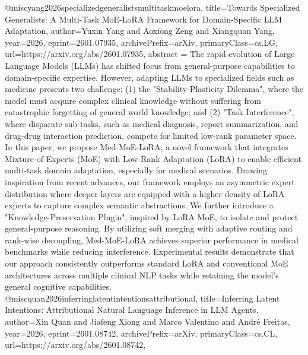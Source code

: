 {}@misc{yang2026specializedgeneralistsmultitaskmoelora,
      title={Towards Specialized Generalists: A Multi-Task MoE-LoRA Framework for Domain-Specific LLM Adaptation}, 
      author={Yuxin Yang and Aoxiong Zeng and Xiangquan Yang},
      year={2026},
      eprint={2601.07935},
      archivePrefix={arXiv},
      primaryClass={cs.LG},
      url={https://arxiv.org/abs/2601.07935},
      abstract = {The rapid evolution of Large Language Models (LLMs) has shifted focus from general-purpose capabilities to domain-specific expertise. However, adapting LLMs to specialized fields such as medicine presents two challenge: (1) the "Stability-Plasticity Dilemma", where the model must acquire complex clinical knowledge without suffering from catastrophic forgetting of general world knowledge; and (2) "Task Interference", where disparate sub-tasks, such as medical diagnosis, report summarization, and drug-drug interaction prediction, compete for limited low-rank parameter space. In this paper, we propose Med-MoE-LoRA, a novel framework that integrates Mixture-of-Experts (MoE) with Low-Rank Adaptation (LoRA) to enable efficient multi-task domain adaptation, especially for medical scenarios. Drawing inspiration from recent advances, our framework employs an asymmetric expert distribution where deeper layers are equipped with a higher density of LoRA experts to capture complex semantic abstractions. We further introduce a "Knowledge-Preservation Plugin", inspired by LoRA MoE, to isolate and protect general-purpose reasoning. By utilizing soft merging with adaptive routing and rank-wise decoupling, Med-MoE-LoRA achieves superior performance in medical benchmarks while reducing interference. Experimental results demonstrate that our approach consistently outperforms standard LoRA and conventional MoE architectures across multiple clinical NLP tasks while retaining the model's general cognitive capabilities.}
}@misc{quan2026inferringlatentintentionsattributional,
      title={Inferring Latent Intentions: Attributional Natural Language Inference in LLM Agents}, 
      author={Xin Quan and Jiafeng Xiong and Marco Valentino and André Freitas},
      year={2026},
      eprint={2601.08742},
      archivePrefix={arXiv},
      primaryClass={cs.CL},
      url={https://arxiv.org/abs/2601.08742},
}

